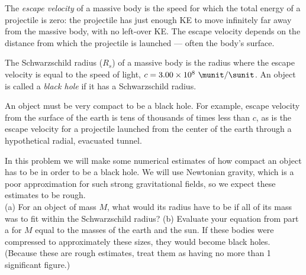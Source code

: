 The \emph{escape velocity} of a massive body is the
speed for which the total energy of a projectile is zero: the projectile
has just enough KE to move infinitely far away from the massive body,
with no left-over KE. The escape velocity depends on the distance
from which the projectile is launched --- often the body's surface.

The Schwarzschild radius ($R_s$) of a massive
body is the radius where the escape velocity is equal to the speed of
light, $c = 3.00 \times 10^8\ \munit/\sunit$. An object is called a
\emph{black hole} if it has a Schwarzschild
radius. 

An object must be very compact to be a black hole. For example,
escape velocity from the surface of the earth is tens of thousands of
times less than $c$, as is the escape velocity for a projectile launched
from the center of the earth through a hypothetical radial, evacuated tunnel.

In this problem we will make some numerical estimates of how compact an object
has to be in order to be a black hole. We will use Newtonian gravity, which
is a poor approximation for such strong gravitational fields, so we expect these
estimates to be rough.\\
%
(a) For an object of mass $M$, what would its radius have to be if all of its
mass was to fit within the Schwarzschild radius?\answercheck\hwendpart
%
(b) Evaluate your equation from part a for $M$ equal to the masses of the
earth and the sun. If these bodies were compressed to approximately these
sizes, they would become black holes. (Because these are rough estimates, treat them as having
no more than 1 significant figure.)\answercheck
